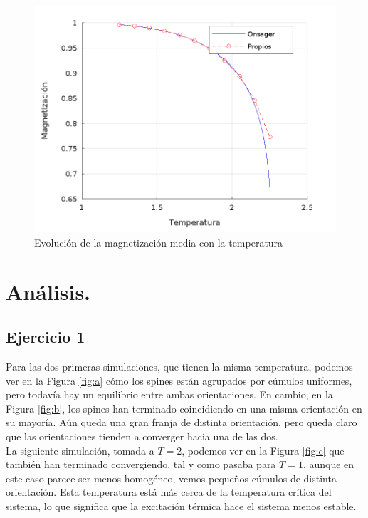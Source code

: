 \documentclass[a4paper,12pt,spanish]{article}
\begin{document}
	\begin{figure}[H]
		\centering
		\includegraphics[width=0.9\linewidth]{../obtencion_resultados/grafica_ej3}
		\caption{Evolución de la magnetización media con la temperatura}
		\label{fig:graficaej3}
	\end{figure}
	
	
	


	\section{Análisis.}

\subsection{Ejercicio 1}


Para las dos primeras simulaciones, que tienen la misma temperatura, podemos ver en la Figura \ref{fig:a} cómo los spines están agrupados por cúmulos uniformes, pero todavía hay un equilibrio entre ambas orientaciones. En cambio, en la Figura \ref{fig:b}, los spines han terminado coincidiendo en una misma orientación en su mayoría. Aún queda una gran franja de distinta orientación, pero queda claro que las orientaciones tienden a converger hacia una de las dos. \\

La siguiente simulación, tomada a $T = 2$, podemos ver en la Figura \ref{fig:c} que también han terminado convergiendo, tal y como pasaba para $T = 1$, aunque en este caso parece ser menos homogéneo, vemos pequeños cúmulos de distinta orientación. Esta temperatura está más cerca de la temperatura crítica del sistema, lo que significa que la excitación térmica hace el sistema menos estable.\\
\end{document}
